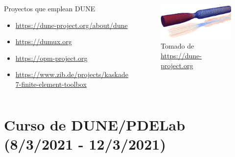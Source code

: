 \begin{frame}
	\frametitle{\secname}
	\framesubtitle{\subsecname}

	\begin{columns}
		\begin{column}{0.5\textwidth}
			\begin{alertblock}{Proyectos que emplean DUNE}
				\begin{itemize}
					\item \url{https://dune-project.org/about/dune}
					\item \url{https://dumux.org}
					\item \url{https://opm-project.org}
					\item \url{https://www.zib.de/projects/kaskade7-finite-element-toolbox}
				\end{itemize}
			\end{alertblock}
		\end{column}

		\begin{column}{0.5\textwidth}
			\begin{figure}[ht!]
				\centering
				\includegraphics[width=7cm]{blood_girke}
				\caption{Tomado de \url{https://dune-project.org}}
			\end{figure}
		\end{column}
	\end{columns}
\end{frame}

\section{Curso de DUNE/PDELab (8/3/2021 - 12/3/2021)}

